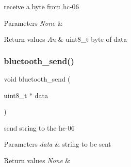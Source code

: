 receive a byte from hc-\/06 


\begin{DoxyParams}{Parameters}
{\em None} & \\
\hline
\end{DoxyParams}

\begin{DoxyRetVals}{Return values}
{\em An} & uint8\+\_\+t byte of data \\
\hline
\end{DoxyRetVals}
\mbox{\label{group___bluetooth___trans_ga31d829d5658369ee2c90b9c3cdbedfe1}} 
\subsubsection{\texorpdfstring{bluetooth\+\_\+send()}{bluetooth\_send()}}
{\footnotesize\ttfamily void bluetooth\+\_\+send (\begin{DoxyParamCaption}\item[{uint8\+\_\+t $\ast$}]{data }\end{DoxyParamCaption})}



send string to the hc-\/06 


\begin{DoxyParams}{Parameters}
{\em data} & string to be sent \\
\hline
\end{DoxyParams}

\begin{DoxyRetVals}{Return values}
{\em None} & \\
\hline
\end{DoxyRetVals}
